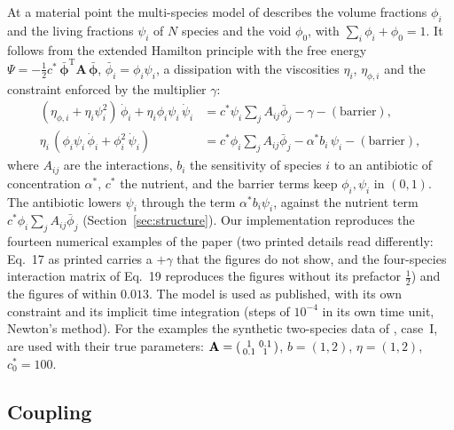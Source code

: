 \documentclass[11pt,a4paper]{article}
\begin{document}
At a material point the multi-species model of \citet{Klempt2026ContinuumBacterialGrowth} describes the volume fractions $\phi_i$ and the living fractions $\psi_i$ of $N$ species and the void $\phi_0$, with $\sum_i\phi_i+\phi_0=1$. It follows from the extended Hamilton principle with the free energy $\Psi=-\tfrac12c^*\,\bar{\bm\phi}^{\mathrm T}\mathbf A\,\bar{\bm\phi}$, $\bar\phi_i=\phi_i\psi_i$, a dissipation with the viscosities $\eta_i$, $\eta_{\phi,i}$ and the constraint enforced by the multiplier $\gamma$:
\begin{equation}
\begin{aligned}
(\eta_{\phi,i}+\eta_i\psi_i^2)\,\dot\phi_i+\eta_i\phi_i\psi_i\,\dot\psi_i
&= c^*\psi_i\textstyle\sum_j A_{ij}\bar\phi_j-\gamma-(\text{barrier}),\\
\eta_i\,(\phi_i\psi_i\,\dot\phi_i+\phi_i^2\,\dot\psi_i)
&= c^*\phi_i\textstyle\sum_j A_{ij}\bar\phi_j-\alpha^* b_i\,\psi_i-(\text{barrier}),
\end{aligned}
\label{eq:point}
\end{equation}
where $A_{ij}$ are the interactions, $b_i$ the sensitivity of species $i$ to an antibiotic of concentration $\alpha^*$, $c^*$ the nutrient, and the barrier terms keep $\phi_i,\psi_i$ in $(0,1)$. The antibiotic lowers $\psi_i$ through the term $\alpha^*b_i\psi_i$, against the nutrient term $c^*\phi_i\sum_jA_{ij}\bar\phi_j$ (Section~\ref{sec:structure}). Our implementation reproduces the fourteen numerical examples of the paper (two printed details read differently: Eq.~17 as printed carries a $+\gamma$ that the figures do not show, and the four-species interaction matrix of Eq.~19 reproduces the figures without its prefactor $\tfrac12$) and the figures of \citet{Fritsch2025BayesianMicrofilms} within $0.013$. The model is used as published, with its own constraint and its implicit time integration (steps of $10^{-4}$ in its own time unit, Newton's method). For the examples the synthetic two-species data of \citet{Fritsch2025BayesianMicrofilms}, case~I, are used with their true parameters: $\mathbf A=\begin{psmallmatrix}1&0.1\\0.1&1\end{psmallmatrix}$, $b=(1,2)$, $\eta=(1,2)$, $c^*_0=100$.

\subsection{Coupling}
\label{sec:coupling}
\end{document}
